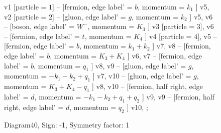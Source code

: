 \documentclass{revtex4}
\begin{document}
\begin{figure}[!htb]
\begin{center}
{    %
v1 [particle = \(1\)] -- [fermion, edge label' = \(b\), momentum = \(k_{1}\) ] v5, 
v2 [particle = \(2\)] -- [gluon, edge label' = \(g\), momentum = \(k_{2}\) ] v5, 
v6 -- [boson, edge label' = \(W^{-}\), momentum = \(K_{3}\) ] v3 [particle = \(3\)], 
v6 -- [fermion, edge label' = \(t\), momentum = \(K_{4}\) ] v4 [particle = \(4\)], 
v5 -- [fermion, edge label' = \(b\), momentum = \(k_{1} + k_{2}\) ] v7, 
v8 -- [fermion, edge label' = \(b\), momentum = \(K_{3} + K_{4}\) ] v6, 
v7 -- [fermion, edge label' = \(b\), momentum = \(q_{1}\) ] v8, 
v9 -- [gluon, edge label' = \(g\), momentum = \(-k_{1} - k_{2} + q_{1}\) ] v7, 
v10 -- [gluon, edge label' = \(g\), momentum = \(K_{3} + K_{4} - q_{1}\) ] v8, 
v10 -- [fermion, half right, edge label' = \(d\), momentum = \(-k_{1} - k_{2} + q_{1} + q_{2}\) ] v9, 
v9 -- [fermion, half right, edge label' = \(d\), momentum = \(q_{2}\) ] v10, 
};
\end{center}
\caption{Diagram40, Sign: -1, Symmetry factor: 1}
\end{figure}
\newpage
\end{document}
